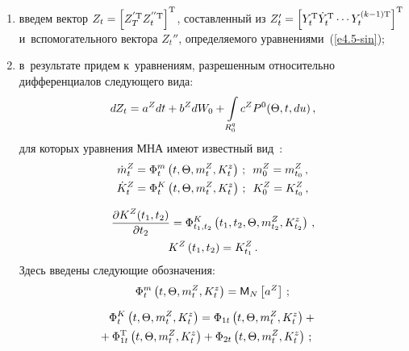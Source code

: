 \begin{multicols}{2}
\begin{enumerate}[(1)]
\item введем вектор  $Z_t = \left[ Z_{T}^{'\mathrm{T}} Z_t^{''\mathrm{T}}\right]^{\mathrm{T}}$, 
составленный из $Z_t' = \left[ Y_t^{\mathrm{T}} \dot{Y}_t^{\mathrm{T}}\cdots 
Y_t^{(k-1)\mathrm{T}}\right]^{\mathrm{T}}$ и~вспомогательного вектора $Z_t''$, 
определяемого уравнениями~(\ref{e4.5-sin});

\item в~результате придем к~уравнениям, разрешенным относительно дифференциалов 
следу\-юще\-го вида:
\begin{equation*}
dZ_t = a^Z  dt + b^Z  d W_0 + \int\limits_{R_0^q} c^Z P^0(\Theta,t,du)\,,
\end{equation*}
для которых уравнения МНА имеют известный вид~\cite{1-sin, 2-sin}:
  \begin{gather}
  \dot m_t^Z = \Phi_t^m \left(t,\Theta,m_t^Z, K_t^z\right)\,; \enskip 
  m_0^Z = m_{t_0}^Z\,,\label{e4.7-sin}\\
  \dot K_t^Z = \Phi_t^K \left(t,\Theta,m_t^Z, K_t^z\right)\,; \enskip 
  K_0^Z = K_{t_0}^Z\,,\label{e4.8-sin}
  \end{gather}
  
  \vspace*{-14pt}
  
  \noindent
  \begin{multline}
   \displaystyle\frac{\displaystyle \partial K^Z (t_1, t_2)\mathstrut}{\displaystyle \partial t_2\mathstrut} = \Phi_{t_1, t_2}^K 
    \left(t_1, t_2,\Theta,m_{t_2}^Z, K_{t_2}^z\right)\,, \\
        K^Z\left(t_1, t_2\right) = K_{t_1}^Z\,.
               \label{e4.9-sin}
    \end{multline}
Здесь введены следующие обозначения:
    \begin{equation}
    \Phi_t^m\left(t,\Theta,m_t^Z, K_t^z\right)= {\sf M}_N\left[ a^Z\right]\,;\label{e4.10-sin}
    \end{equation}
    
            \vspace*{-15pt}
        
        \noindent
        \begin{multline}
    \Phi_t^K \left(t,\Theta,m_t^Z, K_t^z\right) =
        \Phi_{1t} \left(t,\Theta,m_t^Z, K_t^z\right)+{}\\
\hspace*{-5mm}{}+
    \Phi_{1t}^{\mathrm{T}} \left(t,\Theta,m_t^Z, K_t^z\right)+
    \Phi_{2t}\left(t,\Theta,m_t^Z, K_t^z\right)\,;\label{e4.11-sin}
    \end{multline}
    
    \vspace*{-3pt}
    

\end{enumerate}
\end{multicols}
